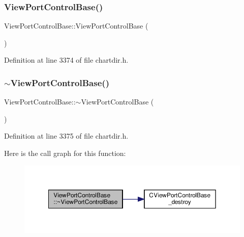 \subsubsection{\texorpdfstring{View\+Port\+Control\+Base()}{ViewPortControlBase()}}
{\footnotesize\ttfamily View\+Port\+Control\+Base\+::\+View\+Port\+Control\+Base (\begin{DoxyParamCaption}{ }\end{DoxyParamCaption})\hspace{0.3cm}{\ttfamily [inline]}}



Definition at line 3374 of file chartdir.\+h.

\mbox{\label{class_view_port_control_base_aec61d9470aafef379ced9e889a22069f}} 
\subsubsection{\texorpdfstring{$\sim$\+View\+Port\+Control\+Base()}{~ViewPortControlBase()}}
{\footnotesize\ttfamily View\+Port\+Control\+Base\+::$\sim$\+View\+Port\+Control\+Base (\begin{DoxyParamCaption}{ }\end{DoxyParamCaption})\hspace{0.3cm}{\ttfamily [inline]}}



Definition at line 3375 of file chartdir.\+h.

Here is the call graph for this function\+:
\nopagebreak
\begin{figure}[H]
\begin{center}
\leavevmode
\includegraphics[width=350pt]{class_view_port_control_base_aec61d9470aafef379ced9e889a22069f_cgraph}
\end{center}
\end{figure}


